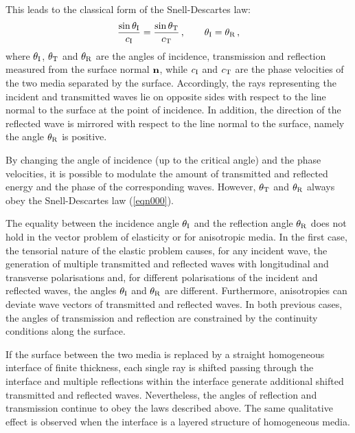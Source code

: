 \documentclass[10p]{article}
\begin{document}
This leads to the classical form of the Snell-Descartes law: 
\begin{equation}
\label{eqn000}
\frac {\sin \theta _\textup{I}}{c _\textup{I}}=\frac {\sin \theta _\textup{T}}{c _\textup{T}} \,,\qquad  \theta _\textup{I}=\theta _\textup{R}\,,
\end{equation}
where $\theta_\textup{I}$, $\theta_\textup{T}$ and $\theta_\textup{R}$ are the angles of incidence, transmission and reflection measured from the surface normal ${\bf n}$, while $c_\textup{I}$ and $c_\textup{T}$ are the phase velocities of the two media separated by the surface. Accordingly, the rays representing the incident and transmitted waves lie on opposite sides with respect to the line normal to the surface at the point of incidence.
In addition, the direction of the reflected wave is mirrored with respect to the line normal to the surface, namely the angle $\theta_\textup{R}$ is positive.  

By changing the angle of incidence (up to the critical angle) and the phase velocities, it is possible to modulate the amount of transmitted and reflected energy and the phase of the corresponding waves. However, $\theta_\textup{T}$ and $\theta_\textup{R}$ always obey the Snell-Descartes law (\ref{eqn000}).


The equality between the incidence angle $\theta_\textup{I}$ and the reflection angle $\theta_\textup{R}$ does not hold in the vector problem of elasticity or for anisotropic media. In the first case, the tensorial nature of the elastic  problem causes, for any incident wave, the generation of multiple transmitted and reflected waves with longitudinal and transverse polarisations\cite{Achenbach1973} and, for different polarisations of the incident and reflected waves, the angles $\theta_\textup{I}$ and $\theta_\textup{R}$ are different. Furthermore, anisotropies can deviate wave vectors of transmitted and reflected waves\cite{Royer1960,Born1980,Lekner1987}. In both previous cases, the angles of transmission and reflection are constrained by the continuity conditions along the surface. 


If the surface between the two media is replaced by a straight homogeneous interface of finite thickness, each single ray is shifted passing through the interface and multiple reflections within the interface generate additional shifted transmitted and reflected waves. Nevertheless, the angles of reflection and transmission continue to obey the laws described above. The same qualitative effect is observed when the interface is a layered structure of homogeneous media\cite{Ewing1953,Brekhovskikh1960}.
\end{document}
